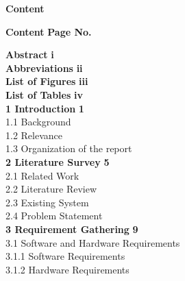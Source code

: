 \documentclass[12pt]{article}
\begin{document}
\setcounter{page}{5}   %

\begin{center}
    {\Large \bfseries Content}
\end{center}

\vspace{1em}

\noindent \textbf{Content} \hfill \textbf{Page No.}

\vspace{0.5em}

\noindent \textbf{Abstract} \hfill \textbf{i} \\[6pt]
\noindent \textbf{Abbreviations} \hfill \textbf{ii} \\[6pt]
\noindent \textbf{List of Figures} \hfill \textbf{iii} \\[6pt]
\noindent \textbf{List of Tables} \hfill \textbf{iv} \\[10pt]

\noindent \textbf{1 \hspace{0.5em} Introduction} \hfill  \textbf{1} \\[6pt]
\hspace*{1cm} 1.1 Background  \\[6pt]
\hspace*{1cm} 1.2 Relevance  \\[6pt]
\hspace*{1cm} 1.3 Organization of the report  \\[10pt]

\noindent \textbf{2 \hspace{0.5em} Literature Survey} \hfill  \textbf{5} \\[6pt]
\hspace*{1cm} 2.1 Related Work  \\[6pt]
\hspace*{1cm} 2.2 Literature Review  \\[6pt]
\hspace*{1cm} 2.3 Existing System  \\[6pt]
\hspace*{1cm} 2.4 Problem Statement  \\[10pt]

\noindent \textbf{3 \hspace{0.5em} Requirement Gathering} \hfill  \textbf{9} \\[6pt]
\hspace*{1cm} 3.1 Software and Hardware Requirements  \\[6pt]
\hspace*{2cm} 3.1.1 Software Requirements  \\[6pt]
\hspace*{2cm} 3.1.2 Hardware Requirements  \\[10pt]
\end{document}
